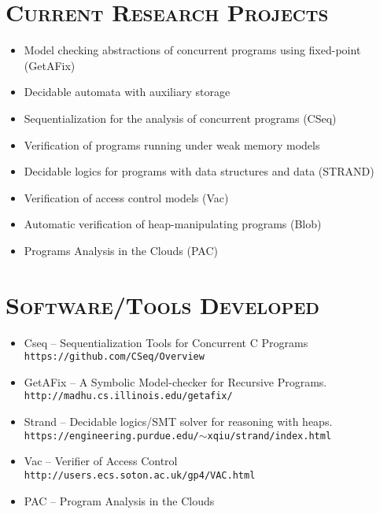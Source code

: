 \begin{resume}
\section{\bfseries \scshape  Current Research Projects}
\begin{itemize}
   \item Model checking abstractions of concurrent programs using fixed-point ({\sc GetAFix})
   \item Decidable automata with auxiliary storage
   \item Sequentialization for the analysis of concurrent programs ({\sc CSeq})
   \item Verification of programs running under weak memory models
   \item Decidable logics for programs with data structures and data (STRAND)
   \item Verification of access control models ({\sc Vac})
   \item Automatic verification of heap-manipulating programs ({\sc Blob})
   \item  Programs Analysis in the Clouds  ({\sc PAC})

\end{itemize}






\section{\bfseries \scshape  Software/Tools Developed}
\begin{itemize}
   \item {\sc Cseq} -- Sequentialization Tools for Concurrent C Programs\\
         {\tt https://github.com/CSeq/Overview}
   \item {\sc GetAFix} --  A Symbolic Model-checker for Recursive Programs.\\
         {\tt http://madhu.cs.illinois.edu/getafix/}   
   \item {\sc Strand} -- Decidable logics/SMT solver for reasoning with heaps.\\
         {\tt https://engineering.purdue.edu/$\sim$xqiu/strand/index.html}
   \item {\sc Vac} -- Verifier of Access Control\\
         {\tt http://users.ecs.soton.ac.uk/gp4/VAC.html}
   \item {\sc PAC} -- Program Analysis in the Clouds\\
   

\end{itemize}
\end{resume}
